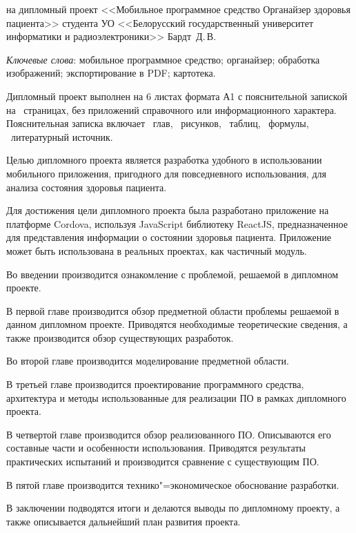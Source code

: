 \thispagestyle{empty}

\begin{center}
  \begin{minipage}{0.82\textwidth}
    на дипломный проект <<Мобильное программное средство Органайзер здоровья пациента>> студента УО <<Белорусский государственный университет информатики и радиоэлектроники>> Бардт~Д.\,В.
  \end{minipage}
\end{center}

\emph{Ключевые слова}: мобильное программное средство; органайзер; обработка изображений; экспортирование в PDF; картотека.

\vspace{4\parsep}

Дипломный проект выполнен на 6 листах формата А1 с пояснительной запиской на~\pageref*{LastPage} страницах, без приложений справочного или информационного характера. 
Пояснительная записка включает ~глав, \totfig{}~рисунков, \tottab{}~таблиц, \toteq{}~формулы, \totref{}~литературный источник.

Целью дипломного проекта является разработка удобного в использовании мобильного приложения, пригодного для повседневного использования, для анализа состояния здоровья пациента.

Для достижения цели дипломного проекта была разработано приложение на платформе Cordova, используя JavaScript библиотеку ReactJS, предназначенное для представления информации о состоянии здоровья пациента.
Приложение может быть использована в реальных проектах, как частичный модуль.

Во введении производится ознакомление с проблемой, решаемой в дипломном проекте.

В первой главе производится обзор предметной области проблемы решаемой в данном дипломном проекте.
Приводятся необходимые теоретические сведения, а также производится обзор существующих разработок.

Во второй главе производится моделирование предметной области.

В третьей главе производится проектирование программного средства, архитектура и методы использованные для реализации ПО в рамках дипломного проекта.

В четвертой главе производится обзор реализованного ПО.
Описываются его составные части и особенности использования.
Приводятся результаты практических испытаний и производится сравнение с существующим ПО.

В пятой главе производится технико"=экономическое обоснование разработки.

В заключении подводятся итоги и делаются выводы по дипломному проекту, а также описывается дальнейший план развития проекта.

\clearpage